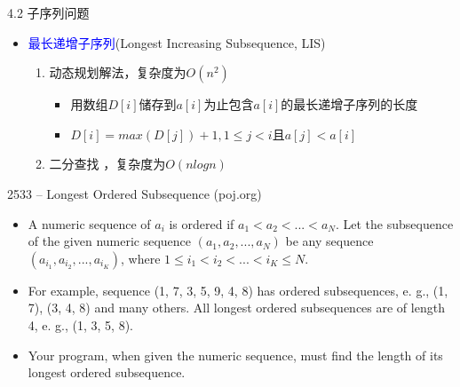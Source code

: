 \begin{frame}{4.2 子序列问题}
    \begin{itemize}
        \item \textcolor{blue}{最长递增子序列}(Longest Increasing Subsequence, LIS)
        \vfill
        \begin{enumerate}
            \item 动态规划解法，复杂度为$O(n^2)$
            \begin{itemize}
                \item 用数组$D[i]$储存到$a[i]$为止包含$a[i]$的最长递增子序列的长度
                \item $D[i]=max⁡(D[j])+1,1\leq j < i$且$a[j] < a[i]$
            \end{itemize}
            \vfill
            \vfill
            \item 二分查找 ，复杂度为$O(nlogn)$
        \end{enumerate}
    \end{itemize}
\end{frame}
\begin{frame}{2533 -- Longest Ordered Subsequence (poj.org)}
    \begin{itemize}
        \item A numeric sequence of $a_i$ is ordered if $a_1 < a_2 < ... < a_N$. Let the subsequence of the given numeric sequence $(a_1, a_2, ..., a_N)$ be any sequence $(a_{i_1}, a_{i_2}, ..., a_{i_K})$, where $1 \leq i_1 < i_2 < ... < i_K \leq N$.
        \item For example, sequence (1, 7, 3, 5, 9, 4, 8) has ordered subsequences, e. g., (1, 7), (3, 4, 8) and many others. All longest ordered subsequences are of length 4, e. g., (1, 3, 5, 8).
        \item Your program, when given the numeric sequence, must find the length of its longest ordered subsequence.
    \end{itemize}
\end{frame}
